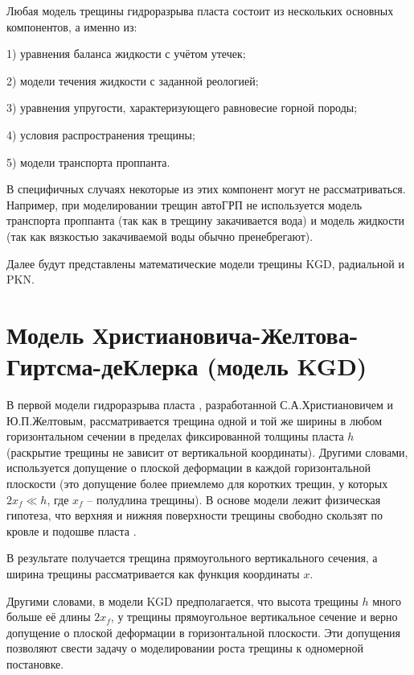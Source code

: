 Любая модель трещины гидроразрыва пласта состоит из нескольких основных компонентов, а именно из:

1) уравнения баланса жидкости с учётом утечек;

2) модели течения жидкости с заданной реологией;

3) уравнения упругости, характеризующего равновесие горной породы;

4) условия распространения трещины;

5) модели транспорта проппанта.

В специфичных случаях некоторые из этих компонент могут не рассматриваться.
Например, при моделировании трещин автоГРП не используется модель транспорта проппанта (так как в трещину закачивается вода) и модель жидкости (так как вязкостью закачиваемой воды обычно пренебрегают).

Далее будут представлены математические модели трещины KGD, радиальной и PKN.

\section{Модель Христиановича-Желтова-Гиртсма-деКлерка (модель KGD)}
\vspace*{-5mm}

В первой модели гидроразрыва пласта \cite{khristianovic_zheltov}, разработанной С.А.Христиановичем и Ю.П.Желтовым, рассматривается трещина одной и той же ширины в любом горизонтальном сечении в пределах фиксированной толщины пласта $h$ (раскрытие трещины не зависит от вертикальной координаты).
Другими словами, используется допущение о плоской деформации в каждой горизонтальной плоскости (это допущение более приемлемо для коротких трещин, у которых $2x_{\!f}\ll h$, где $x_{\!f}$ -- полудлина трещины).
В основе модели лежит физическая гипотеза, что верхняя и нижняя поверхности трещины свободно скользят по кровле и подошве пласта \cite{economides}.

В результате получается трещина прямоугольного вертикального сечения, а ширина трещины рассматривается как функция координаты $x$.

Другими словами, в модели KGD предполагается, что высота трещины $h$ много больше её длины $2x_{\!f}$, у трещины прямоугольное вертикальное сечение и верно допущение о плоской деформации в горизонтальной плоскости.
Эти допущения позволяют свести задачу о моделировании роста трещины к одномерной постановке.


